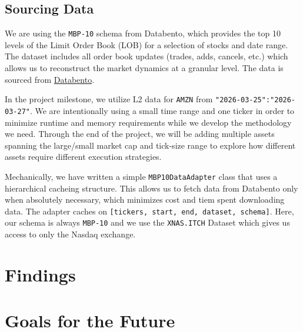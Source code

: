\documentclass[
  letterpaper,
]{article}
\begin{document}
\subsection{Sourcing Data}\label{sourcing-data}

We are using the \texttt{MBP-10} schema from Databento, which provides
the top 10 levels of the Limit Order Book (LOB) for a selection of
stocks and date range. The dataset includes all order book updates
(trades, adds, cancels, etc.) which allows us to reconstruct the market
dynamics at a granular level. The data is sourced from
\href{https://databento.com/docs/schemas-and-data-formats/mbp-10?historical=python&live=python&reference=python}{Databento}.

In the project milestone, we utilize L2 data for \texttt{AMZN} from
\texttt{"2026-03-25":"2026-03-27"}. We are intentionally using a small
time range and one ticker in order to minimize runtime and memory
requirements while we develop the methodology we need. Through the end
of the project, we will be adding multiple assets spanning the
large/small market cap and tick-size range to explore how different
assets require different execution strategies.

Mechanically, we have written a simple \texttt{MBP10DataAdapter} class
that uses a hierarchical cacheing structure. This allows us to fetch
data from Databento only when absolutely necessary, which minimizes cost
and tiem spent downloading data. The adapter caches on
\texttt{{[}tickers,\ start,\ end,\ dataset,\ schema{]}}. Here, our
schema is always \texttt{MBP-10} and we use the \texttt{XNAS.ITCH}
Dataset which gives us access to only the Nasdaq exchange.

\section{Findings}\label{findings}

\section{Goals for the Future}\label{goals-for-the-future}
\end{document}
